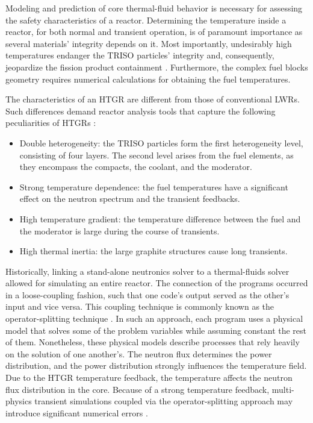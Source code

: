 Modeling and prediction of core thermal-fluid behavior is necessary for assessing the safety characteristics of a reactor.
Determining the temperature inside a reactor, for both normal and transient operation, is of paramount importance as several materials' integrity depends on it.
Most importantly, undesirably high temperatures endanger the TRISO particles' integrity and, consequently, jeopardize the fission product containment \cite{tak_numerical_2008}.
Furthermore, the complex fuel blocks geometry requires numerical calculations for obtaining the fuel temperatures.

The characteristics of an \gls{HTGR} are different from those of conventional \glspl{LWR}.
Such differences demand reactor analysis tools that capture the following peculiarities of \glspl{HTGR} \cite{rohde_development_2012}\cite{bostelmann_criticality_2016}:
\begin{itemize}
\item Double heterogeneity: the TRISO particles form the first heterogeneity level, consisting of four
layers.
The second level arises from the fuel elements, as they encompass the compacts, the coolant, and the moderator.
\item Strong temperature dependence: the fuel temperatures have a significant effect on the neutron spectrum and the transient feedbacks.
\item High temperature gradient: the temperature difference between the fuel and the moderator is large during the course of transients.
\item High thermal inertia: the large graphite structures cause long transients.
\end{itemize}

Historically, linking a stand-alone neutronics solver to a thermal-fluids solver allowed for simulating an entire reactor.
The connection of the programs occurred in a loose-coupling fashion, such that one code's output served as the other's input and vice versa.
This coupling technique is commonly known as the operator-splitting technique \cite{ragusa_consistent_2009}.
In such an approach, each program uses a physical model that solves some of the problem variables while assuming constant the rest of them.
Nonetheless, these physical models describe processes that rely heavily on the solution of one another's.
The neutron flux determines the power distribution, and the power distribution strongly influences the temperature field.
Due to the \gls{HTGR} temperature feedback, the temperature affects the neutron flux distribution in the core.
Because of a strong temperature feedback, multi-physics transient simulations coupled via the operator-splitting approach may introduce significant numerical errors \cite{park_tightly_2010}\cite{ragusa_consistent_2009}.

